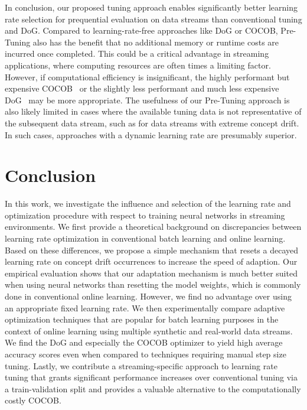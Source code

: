 \documentclass{article} %
\begin{document}
In conclusion, our proposed tuning approach enables significantly better learning rate selection for prequential evaluation on data streams than conventional tuning and DoG.
Compared to learning-rate-free approaches like DoG or COCOB, Pre-Tuning also has the benefit that no additional memory or runtime costs are incurred once completed.
This could be a critical advantage in streaming applications, where computing resources are often times a limiting factor.
However, if computational efficiency is insignificant, the highly performant but expensive COCOB~\citep{orabonaTrainingDeepNetworks2017} or the slightly less performant and much less expensive DoG~\citep{ivgiDoGSGDBest2023} may be more appropriate.
The usefulness of our Pre-Tuning approach is also likely limited in cases where the available tuning data is not representative of the subsequent data stream, such as for data streams with extreme concept drift.
In such cases, approaches with a dynamic learning rate are presumably superior.

\section{Conclusion}

In this work, we investigate the influence and selection of the learning rate and optimization procedure with respect to training neural networks in streaming environments.
We first provide a theoretical background on discrepancies between learning rate optimization in conventional batch learning and online learning.
Based on these differences, we propose a simple mechanism that resets a decayed learning rate on concept drift occurrences to increase the speed of adaption.
Our empirical evaluation shows that our adaptation mechanism is much better suited when using neural networks than resetting the model weights, which is commonly done in conventional online learning.
However, we find no advantage over using an appropriate fixed learning rate.
We then experimentally compare adaptive optimization techniques that are popular for batch learning purposes in the context of online learning using multiple synthetic and real-world data streams.
We find the DoG and especially the COCOB optimizer to yield high average accuracy scores even when compared to techniques requiring manual step size tuning.
Lastly, we contribute a streaming-specific approach to learning rate tuning that grants significant performance increases over conventional tuning via a train-validation split and provides a valuable alternative to the computationally costly COCOB.
\end{document}

